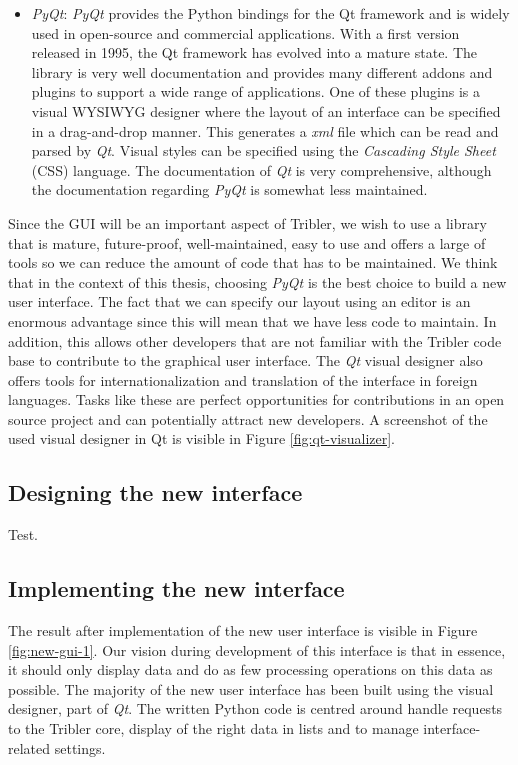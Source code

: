 \begin{itemize}
	\item \emph{PyQt}\cite{summerfield2007rapid}: \emph{PyQt} provides the Python bindings for the Qt framework and is widely used in open-source and commercial applications. With a first version released in 1995, the Qt framework has evolved into a mature state. The library is very well documentation and provides many different addons and plugins to support a wide range of applications. One of these plugins is a visual WYSIWYG designer where the layout of an interface can be specified in a drag-and-drop manner. This generates a \emph{xml} file which can be read and parsed by \emph{Qt}. Visual styles can be specified using the  \emph{Cascading Style Sheet} (CSS) language. The documentation of \emph{Qt} is very comprehensive, although the documentation regarding \emph{PyQt} is somewhat less maintained.
\end{itemize}
Since the GUI will be an important aspect of Tribler, we wish to use a library that is mature, future-proof, well-maintained, easy to use and offers a large of tools so we can reduce the amount of code that has to be maintained. We think that in the context of this thesis, choosing \emph{PyQt} is the best choice to build a new user interface. The fact that we can specify our layout using an editor is an enormous advantage since this will mean that we have less code to maintain. In addition, this allows other developers that are not familiar with the Tribler code base to contribute to the graphical user interface. The \emph{Qt} visual designer also offers tools for internationalization and translation of the interface in foreign languages. Tasks like these are perfect opportunities for contributions in an open source project and can potentially attract new developers. A screenshot of the used visual designer in Qt is visible in Figure \ref{fig:qt-visualizer}.

\subsection{Designing the new interface}
Test.

\subsection{Implementing the new interface}
The result after implementation of the new user interface is visible in Figure \ref{fig:new-gui-1}. Our vision during development of this interface is that in essence, it should only display data and do as few processing operations on this data as possible. The majority of the new user interface has been built using the visual designer, part of \emph{Qt}. The written Python code is centred around handle requests to the Tribler core, display of the right data in lists and to manage interface-related settings.\\

